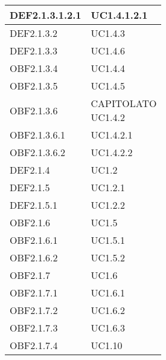 \documentclass{scalatekids-article}
\begin{document}
\begin{longtable}[H]{|p{5.5cm}|p{5.5cm}|}
  \hline
  DEF2.1.3.1.2.1 & \multiLineCell[t]{UC1.4.1.2.1\\}\\
  \hline
  DEF2.1.3.2 & \multiLineCell[t]{UC1.4.3\\}\\
  \hline
  DEF2.1.3.3 & \multiLineCell[t]{UC1.4.6\\}\\
  \hline
  OBF2.1.3.4 & \multiLineCell[t]{UC1.4.4\\}\\
  \hline
  OBF2.1.3.5 & \multiLineCell[t]{UC1.4.5\\}\\
  \hline
  OBF2.1.3.6 & \multiLineCell[t]{CAPITOLATO\\UC1.4.2\\}\\
  \hline
  OBF2.1.3.6.1 & \multiLineCell[t]{UC1.4.2.1\\}\\
  \hline
  OBF2.1.3.6.2 & \multiLineCell[t]{UC1.4.2.2\\}\\
  \hline
  DEF2.1.4 & \multiLineCell[t]{UC1.2\\}\\
  \hline
  DEF2.1.5 & \multiLineCell[t]{UC1.2.1\\}\\
  \hline
  DEF2.1.5.1 & \multiLineCell[t]{UC1.2.2\\}\\
  \hline
  OBF2.1.6 & \multiLineCell[t]{UC1.5\\}\\
  \hline
  OBF2.1.6.1 & \multiLineCell[t]{UC1.5.1\\}\\
  \hline
  OBF2.1.6.2 & \multiLineCell[t]{UC1.5.2\\}\\
  \hline
  OBF2.1.7 & \multiLineCell[t]{UC1.6\\}\\
  \hline
  OBF2.1.7.1 & \multiLineCell[t]{UC1.6.1\\}\\
  \hline
  OBF2.1.7.2 & \multiLineCell[t]{UC1.6.2\\}\\
  \hline
  OBF2.1.7.3 & \multiLineCell[t]{UC1.6.3\\}\\
  \hline
  OBF2.1.7.4 & \multiLineCell[t]{UC1.10\\}\\

\end{longtable}
\end{document}
